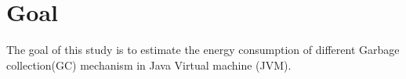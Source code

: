 \section{Goal}
\label{sec:Goal}
The goal of this study is to estimate the energy consumption of different Garbage collection(GC) mechanism in Java Virtual machine (JVM)\cite{jvm}.
